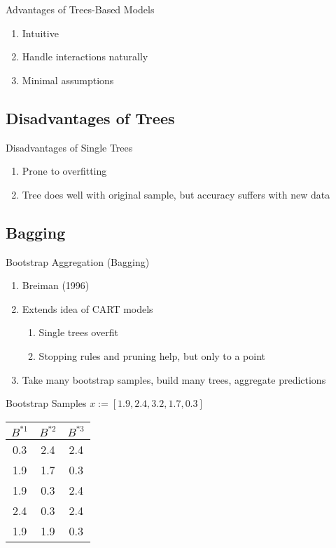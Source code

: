 \documentclass[pdf]{beamer}
\begin{document}
		\begin{frame}{Advantages of Trees-Based Models}
			\begin{enumerate}
				\item{Intuitive}
				\item{Handle interactions naturally}
				\item{Minimal assumptions}
			\end{enumerate}
		\end{frame}
	
	
	\subsection{Disadvantages of Trees}
		
		\begin{frame}{Disadvantages of Single Trees}
			\begin{enumerate}
				\item{Prone to overfitting}
				\item{Tree does well with original sample, but accuracy suffers with new data}
			\end{enumerate}
		\end{frame}
		
\subsection{Bagging}
		\begin{frame}{Bootstrap Aggregation (Bagging)}
			\begin{enumerate}
				\item{Breiman (1996)}
				\item{Extends idea of CART models}
					\begin{enumerate}[1]
						\item{Single trees overfit}
						\item{Stopping rules and pruning help, but only to a point}
					\end{enumerate}
				\item{Take many bootstrap samples, build many trees, aggregate predictions}
			\end{enumerate}
    		\end{frame}
	
		\begin{frame}{Bootstrap Samples}
		$x := [1.9, 2.4, 3.2, 1.7, 0.3]$
		\begin{table}
		\begin{tabular}{c c c}
			\hline
			$B^{*1}$	& $B^{*2}$& $B^{*3}$  \\
			\hline
			0.3 		& 2.4 	& 2.4  \\
			1.9 		& 1.7 	& 0.3 \\
			1.9		& 0.3		& 2.4 \\
			2.4 		& 0.3 	& 2.4 \\
			1.9		& 1.9		& 0.3 \\
			\hline
		\end{tabular}
		\end{table}
		\end{frame}
		
\end{document}
